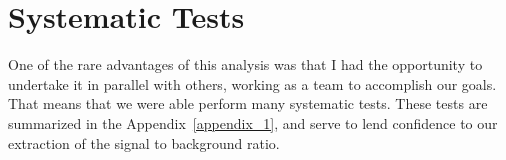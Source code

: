\begin{table}
  \centering
  \caption{ 
    A summary table from the results of the EULMF to the unbinned data set,
    summed to one $\eta$ bin per arm and charge.
  }
\end{table}

\section{Systematic Tests}

One of the rare advantages of this analysis was that I had the opportunity to
undertake it in parallel with others, working as a team to accomplish our goals.
That means that we were able perform many systematic tests. These tests are
summarized in the Appendix~\ref{appendix_1}, and serve to lend confidence to our
extraction of the signal to background ratio.
